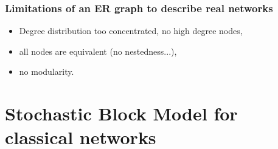 \documentclass[nopagenumber,9pt]{beamer}
\begin{document}
\begin{frame}
 \frametitle{Limitations of an ER graph to describe real networks}
 
 
 
\begin{itemize}
 \item Degree distribution too concentrated, no high degree nodes,
 \item all nodes are equivalent (no nestedness...),
 \item no modularity.

 \end{itemize}

\end{frame}






\section{Stochastic Block Model for classical networks}
\end{document}
